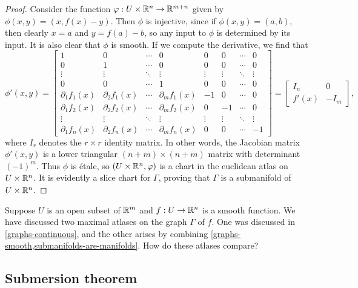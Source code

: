 \begin{proof}
	Consider the function $\varphi : U \times \mathbb{R}^n \to \mathbb{R}^{m+n}$ given by $\phi(x,y) = (x,f(x)-y)$. Then $\phi$ is injective, since if $\phi(x, y) = (a,b)$, then clearly $x = a$ and $y = f(a)-b$, so any input to $\phi$ is determined by its input. It is also clear that $\phi$ is smooth. If we compute the derivative, we find that  
	\[ \phi'(x,y) = \begin{bmatrix} 
	1 & 0 & \dotsb & 0 & 0 & 0 & \dotsb & 0 \\ 
	0 & 1 & \dotsb & 0 & 0 & 0 & \dotsb & 0 \\
	\vdots & \vdots & \ddots & \vdots & \vdots & \vdots & \ddots & \vdots \\
	0 & 0 & \dotsb & 1 & 0 & 0 & \dotsb & 0 \\ 
	\partial_1 f_1(x) & \partial_2 f_1(x) & \dotsb & \partial_m f_1(x) & -1 & 0 & \dotsb & 0 \\
	\partial_1 f_2(x) & \partial_2 f_2(x) & \dotsb & \partial_m f_2(x) & 0 & -1 & \dotsb & 0 \\
	\vdots & \vdots & \ddots & \vdots & \vdots & \vdots & \ddots & \vdots \\
	\partial_1 f_n(x) & \partial_2 f_n(x) & \dotsb & \partial_m f_n(x) & 0 & 0 & \dotsb & -1
	\end{bmatrix} = \begin{bmatrix} I_n & 0 \\ f'(x) & -I_m \end{bmatrix}, \]
	where $I_r$ denotes the $r \times r$ identity matrix. In other words, the Jacobian matrix $\phi'(x,y)$ is a lower triangular $(n+m)\times(n+m)$ matrix with determinant $(-1)^m$. Thus $\phi$ is \'etale, so $(U \times \mathbb{R}^n, \varphi)$ is a chart in the euclidean atlas on $U \times  \mathbb{R}^n$. It is evidently a slice chart for $\Gamma$, proving that $\Gamma$ is a submanifold of $U \times \mathbb{R}^n$. 
\end{proof}

\begin{exercise}
	Suppose $U$ is an open subset of $\mathbb{R}^m$ and $f : U \to \mathbb{R}^n$ is a smooth function. We have discussed two maximal atlases on the graph $\Gamma$ of $f$. One was discussed in \cref{graphs-continuous}, and the other arises by combining \cref{graphs-smooth,submanifolds-are-manifolds}. How do these atlases compare?
\end{exercise}

\subsection{Submersion theorem}

